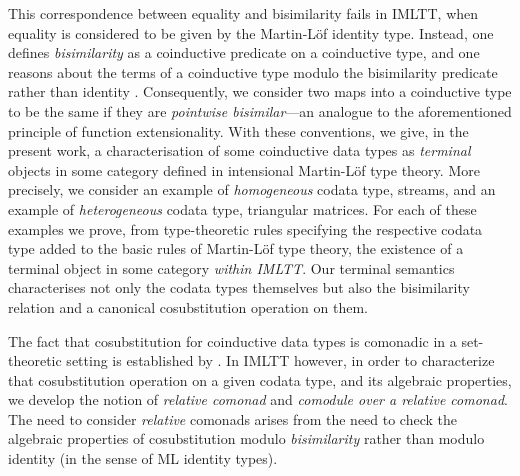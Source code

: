 \documentclass[envcountsame]{llncs}
\begin{document}
 This correspondence between equality and bisimilarity fails in IMLTT, when equality is considered to be given by the 
 Martin-L\"of identity type. Instead, one defines \emph{bisimilarity} as a coinductive predicate 
 on a coinductive type, and one reasons about the terms of a coinductive type modulo the bisimilarity predicate
 rather than identity \parencite{DBLP:conf/types/Coquand93}.
 Consequently, we consider two maps into a coinductive type to be the same if they are \emph{pointwise bisimilar}---an analogue
 to the aforementioned principle of function extensionality. 
 With these conventions, we give, in the present work, a characterisation of some coinductive data types as \emph{terminal} objects in some category 
 defined in intensional Martin-L\"of type theory.
 More precisely, we consider an example of \emph{homogeneous} codata type, streams, and 
 an example of \emph{heterogeneous} codata type, triangular matrices.
 For each of these examples we prove, 
 from type-theoretic rules specifying the respective codata type added to the basic rules of Martin-L\"of type theory,
 the existence of a terminal object in some category \emph{within IMLTT}.
 Our terminal semantics characterises not only the codata types themselves but also the bisimilarity relation and
 a canonical cosubstitution operation on them.
 
 The fact that cosubstitution for coinductive data types is comonadic in a set-theoretic setting is established by \textcite{DBLP:conf/sfp/UustaluV01}.
 In IMLTT however, in order to characterize that cosubstitution operation on a given codata type, and its algebraic properties,
 we develop the notion of \emph{relative comonad} and \emph{comodule over a relative comonad}.
 The need to consider \emph{relative} comonads arises from the  need to check the algebraic properties of cosubstitution modulo \emph{bisimilarity} rather
 than modulo identity (in the sense of ML identity types).
 
 
%  
%  
 
\end{document}
